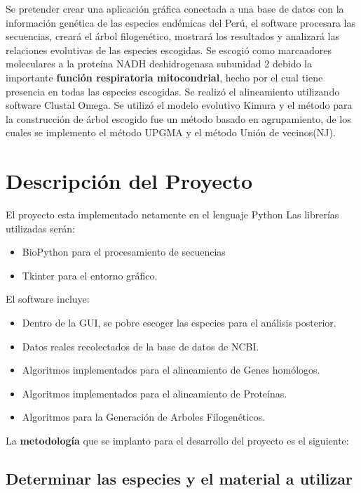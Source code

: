 \documentclass[a4paper]{article}
\begin{document}
Se pretender crear una aplicación gráfica conectada a una base de datos con la información genética de las especies endémicas del Perú, el software procesara las secuencias, creará el árbol filogenético, mostrará los resultados y analizará las relaciones evolutivas de las especies escogidas.
Se escogió como marcaadores moleculares a la proteína NADH deshidrogenasa subunidad 2 debido la importante \textbf{función respiratoria mitocondrial}, hecho por el cual tiene presencia en todas las especies escogidas.
Se realizó el alineamiento utilizando software Clustal Omega.
Se utilizó el modelo evolutivo Kimura y el método para la construcción de árbol escogido fue un método basado en agrupamiento, de los cuales se implemento el método UPGMA y el método Unión de vecinos(NJ).

\section{Descripción del Proyecto}

El proyecto esta implementado netamente en el lenguaje Python
Las librerías utilizadas serán:
\begin{itemize}
\item BioPython para el procesamiento de secuencias
\item Tkinter para el entorno gráfico.

\end{itemize}

\noindent El software incluye:
\begin{itemize}

\item Dentro de la GUI, se pobre escoger las especies para el análisis posterior.
\item Datos reales recolectados de la base de datos de NCBI.
\item Algoritmos implementados para el alineamiento de Genes homólogos.
\item Algoritmos implementados para el alineamiento de Proteínas.
\item Algoritmos para la Generación de Arboles Filogenéticos.

\end{itemize}

\noindent La \textbf{metodología} que se implanto para el desarrollo del proyecto es el siguiente:

\subsection{Determinar las especies y el material a utilizar}
\end{document}
